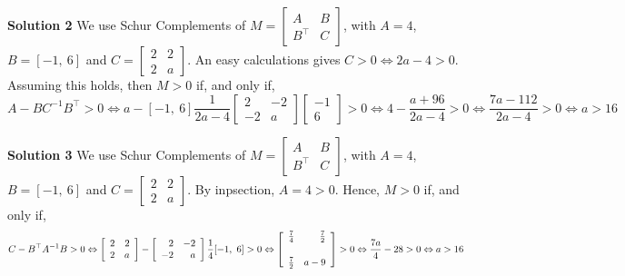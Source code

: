 \documentclass[letterpaper]{article}
\begin{document}
\begin{enumerate}
            \noindent \textbf{Solution 2} We use Schur Complements of $M=\left[  \begin{array}{ll} A & B  \\ B^\top & C \end{array} \right]$, with  $A=4$, $B=[-1, ~6]$ and $C=\left[  \begin{array}{rr} 2 & 2  \\ 2& a \end{array} \right]$. An easy calculations gives $C>0\Leftrightarrow 2a - 4>0$. Assuming this holds, then $M>0$ if, and only if,
        $$A-BC^{-1} B^\top>0 \Leftrightarrow a - [-1, ~6] \frac{1}{2a-4} \left[  \begin{array}{rr} 2 & -2  \\ -2& a \end{array} \right] \left[  \begin{array}{r} -1 \\ 6 \end{array} \right] >0 \Leftrightarrow 4-\frac{a+96}{2a - 4}>0 \Leftrightarrow \frac{7 a - 112}{2 a - 4}>0 \Leftrightarrow a > 16 $$
        
         \noindent \textbf{Solution 3} We use Schur Complements of $M=\left[  \begin{array}{ll} A & B  \\ B^\top & C \end{array} \right]$, with  $A=4$, $B=[-1, ~6]$ and $C=\left[  \begin{array}{rr} 2 & 2  \\ 2& a \end{array} \right]$. By inpsection, $A=4>0$. Hence,  $M>0$ if, and only if,
        $$C-B^\top A^{-1} B>0 \Leftrightarrow \left[  \begin{array}{rr} 2 & 2  \\ 2& a \end{array} \right] - \left[  \begin{array}{rr} 2 & -2  \\ -2& a \end{array} \right] \frac{1}{4} [-1, ~6] >0 \Leftrightarrow \left[  \begin{array}{rr} \frac{7}{4} & \frac{7}{2} \\ \smallskip \\\frac{7}{2}& a-9 \end{array} \right]>0 \Leftrightarrow \frac{7 a}{4}-28>0 \Leftrightarrow a > 16 $$


\end{enumerate}
\end{document}
